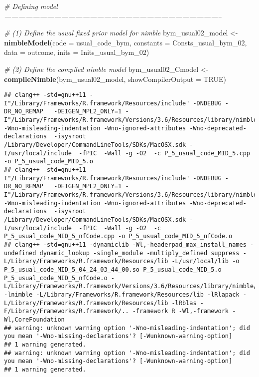 \documentclass[]{article}
\newenvironment{Shaded}{\begin{snugshade}}{\end{snugshade}}
\newcommand{\CommentTok}[1]{\textcolor[rgb]{0.56,0.35,0.01}{\textit{#1}}}
\newcommand{\DataTypeTok}[1]{\textcolor[rgb]{0.13,0.29,0.53}{#1}}
\newcommand{\DecValTok}[1]{\textcolor[rgb]{0.00,0.00,0.81}{#1}}
\newcommand{\KeywordTok}[1]{\textcolor[rgb]{0.13,0.29,0.53}{\textbf{#1}}}
\newcommand{\NormalTok}[1]{#1}
\newcommand{\OtherTok}[1]{\textcolor[rgb]{0.56,0.35,0.01}{#1}}
\newcommand{\StringTok}[1]{\textcolor[rgb]{0.31,0.60,0.02}{#1}}
\begin{document}
\begin{Shaded}
\begin{Highlighting}[]
\CommentTok{# Defining model --------------------------------------------------------------------------------------------}

\CommentTok{# (1) Define the usual fixed prior model for nimble}
\NormalTok{bym_usual02_model <-}\StringTok{ }\KeywordTok{nimbleModel}\NormalTok{(}\DataTypeTok{code =}\NormalTok{ usual_code_bym, }\DataTypeTok{constants =}\NormalTok{ Consts_usual_bym_}\DecValTok{02}\NormalTok{, }
                                 \DataTypeTok{data =}\NormalTok{ outcome, }\DataTypeTok{inits =}\NormalTok{ Inits_usual_bym_}\DecValTok{02}\NormalTok{)}

\CommentTok{# (2) Define the compiled nimble model}
\NormalTok{bym_usual02_Cmodel <-}\StringTok{ }\KeywordTok{compileNimble}\NormalTok{(bym_usual02_model, }\DataTypeTok{showCompilerOutput =} \OtherTok{TRUE}\NormalTok{)      }
\end{Highlighting}
\end{Shaded}

\begin{verbatim}
## clang++ -std=gnu++11 -I"/Library/Frameworks/R.framework/Resources/include" -DNDEBUG -DR_NO_REMAP   -DEIGEN_MPL2_ONLY=1 -I"/Library/Frameworks/R.framework/Versions/3.6/Resources/library/nimble/include" -Wno-misleading-indentation -Wno-ignored-attributes -Wno-deprecated-declarations  -isysroot /Library/Developer/CommandLineTools/SDKs/MacOSX.sdk -I/usr/local/include  -fPIC  -Wall -g -O2  -c P_5_usual_code_MID_5.cpp -o P_5_usual_code_MID_5.o
## clang++ -std=gnu++11 -I"/Library/Frameworks/R.framework/Resources/include" -DNDEBUG -DR_NO_REMAP   -DEIGEN_MPL2_ONLY=1 -I"/Library/Frameworks/R.framework/Versions/3.6/Resources/library/nimble/include" -Wno-misleading-indentation -Wno-ignored-attributes -Wno-deprecated-declarations  -isysroot /Library/Developer/CommandLineTools/SDKs/MacOSX.sdk -I/usr/local/include  -fPIC  -Wall -g -O2  -c P_5_usual_code_MID_5_nfCode.cpp -o P_5_usual_code_MID_5_nfCode.o
## clang++ -std=gnu++11 -dynamiclib -Wl,-headerpad_max_install_names -undefined dynamic_lookup -single_module -multiply_defined suppress -L/Library/Frameworks/R.framework/Resources/lib -L/usr/local/lib -o P_5_usual_code_MID_5_04_24_03_44_00.so P_5_usual_code_MID_5.o P_5_usual_code_MID_5_nfCode.o -L/Library/Frameworks/R.framework/Versions/3.6/Resources/library/nimble/CppCode -lnimble -L/Library/Frameworks/R.framework/Resources/lib -lRlapack -L/Library/Frameworks/R.framework/Resources/lib -lRblas -F/Library/Frameworks/R.framework/.. -framework R -Wl,-framework -Wl,CoreFoundation
## warning: unknown warning option '-Wno-misleading-indentation'; did you mean '-Wno-missing-declarations'? [-Wunknown-warning-option]
## 1 warning generated.
## warning: unknown warning option '-Wno-misleading-indentation'; did you mean '-Wno-missing-declarations'? [-Wunknown-warning-option]
## 1 warning generated.
\end{verbatim}
\end{document}
